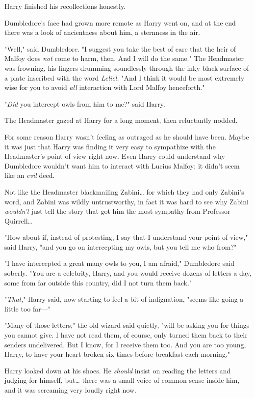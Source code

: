 Harry finished his recollections honestly.

Dumbledore's face had grown more remote as Harry went on, and at the end there 
was a look of ancientness about him, a sternness in the air.

"Well," said Dumbledore. "I suggest you take the best of care that the heir of 
Malfoy does \emph{not} come to harm, then. And I will do the same." The 
Headmaster was frowning, his fingers drumming soundlessly through the inky 
black surface of a plate inscribed with the word \emph{Leliel.} "And I think it 
would be most extremely wise for you to avoid \emph{all} interaction with Lord 
Malfoy henceforth."

"\emph{Did} you intercept owls from him to me?" said Harry.

The Headmaster gazed at Harry for a long moment, then reluctantly nodded.

For some reason Harry wasn't feeling as outraged as he should have been. Maybe 
it was just that Harry was finding it very easy to sympathize with the 
Headmaster's point of view right now. Even Harry could understand why 
Dumbledore wouldn't want him to interact with Lucius Malfoy; it didn't seem 
like an \emph{evil} deed.

Not like the Headmaster blackmailing Zabini{\ldots} for which they had only 
Zabini's word, and Zabini was wildly untrustworthy, in fact it was hard to see 
why Zabini \emph{wouldn't} just tell the story that got him the most sympathy 
from Professor Quirrell{\ldots}

"How about if, instead of protesting, I say that I understand your point of 
view," said Harry, "and you go on intercepting my owls, but you tell me who 
from?"

"I have intercepted a great many owls to you, I am afraid," Dumbledore said 
soberly. "You are a celebrity, Harry, and you would receive dozens of letters a 
day, some from far outside this country, did I not turn them back."

"\emph{That}," Harry said, now starting to feel a bit of indignation, "seems 
like going a little too far---"

"Many of those letters," the old wizard said quietly, "will be asking you for 
things you cannot give. I have not read them, of course, only turned them back 
to their senders undelivered. But I know, for I receive them too. And you are 
too young, Harry, to have your heart broken six times before breakfast each 
morning."

Harry looked down at his shoes. He \emph{should} insist on reading the letters 
and judging for himself, but{\ldots} there was a small voice of common sense 
inside him, and it was screaming very loudly right now.

